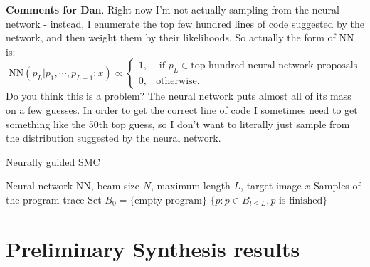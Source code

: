 \documentclass{article}
\newcommand{\probability}{\mathds{P}} %
\begin{document}
\textbf{Comments for Dan}. Right now I'm not actually sampling from
the neural network - instead, I enumerate the top few hundred lines of
code suggested by the network, and then weight them by their
likelihoods.
So actually the form of NN is:
\begin{equation}
  \text{NN}(p_L | p_1,\cdots,p_{L - 1};x)\propto \begin{cases}
    1,&\text{ if }p_L \in \text{top hundred neural network proposals}\\
0,&\text{otherwise}.    \end{cases}
\end{equation}
Do you think this is a problem? The neural network puts almost all of its mass on a few guesses.
In order to get the correct line of code I sometimes need to get something like the 50th  top guess,
so I don't want to literally just sample from the distribution suggested by the neural network.


  \begin{algorithm}[tb]
   \caption{Neurally guided SMC}
   \label{guideAlgorithm}
\begin{algorithmic}
   Neural network NN, beam size $N$, maximum length $L$, target image $x$
   Samples of the program trace
  \STATE Set $B_0 = \{\text{empty program}\}$
  \STATE{ Set $\tilde{w}(r_n) = \frac{L(x|r_n)}{L(x|p_n)}\times\frac{\probability [p'_n]}{\probability [p'_n = \text{NN}(\text{render}(p),x)]}$}
  \ENDFOR
  \ENDFOR
   $\{p : p\in B_{l\leq L}, p \text{ is finished}\}$
\end{algorithmic}
  \end{algorithm}

  \pagebreak
  \section{Preliminary Synthesis results} 




{\small }
\end{document}
